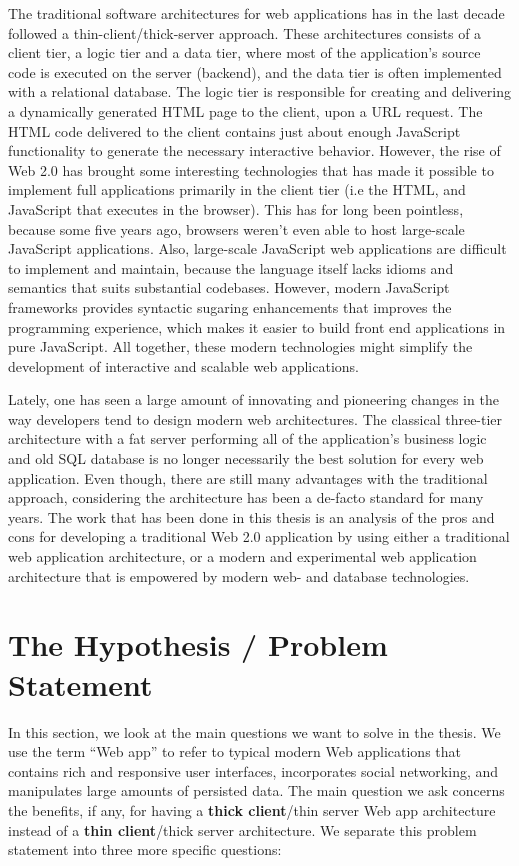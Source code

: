 The traditional software architectures for web applications has in the last decade followed a thin-client/thick-server approach. These architectures consists of a client tier, a logic tier and a data tier, where most of the application's source code is executed on the server (backend), and the data tier is often implemented with a relational database. The logic tier is responsible for creating and delivering a dynamically generated HTML page to the client, upon a URL request. The HTML code delivered to the client contains just about enough JavaScript functionality to generate the necessary interactive behavior. However, the rise of Web 2.0 has brought some interesting technologies that has made it possible to implement full applications primarily in the client tier (i.e the HTML, and JavaScript that executes in the browser). This has for long been pointless, because some five years ago, browsers weren't even able to host large-scale JavaScript applications. Also, large-scale JavaScript web applications are difficult to implement and maintain, because the language itself lacks idioms and semantics that suits substantial codebases. However, modern JavaScript frameworks provides syntactic sugaring enhancements that improves the programming experience, which makes it easier to build front end applications in pure JavaScript. All together, these modern technologies might simplify the development of interactive and scalable web applications. 

Lately, one has seen a large amount of innovating and pioneering changes in the way developers tend to design modern web architectures. The classical three-tier architecture with a fat server performing all of the application's business logic and old SQL database is no longer necessarily the best solution for every web application. Even though, there are still many advantages with the traditional approach, considering the architecture has been a de-facto standard for many years. The work that has been done in this thesis is an analysis of the pros and cons for developing a traditional Web 2.0 application by using either a traditional web application architecture, or a modern and experimental web application architecture that is empowered by modern web- and database technologies.


\section{The Hypothesis / Problem Statement}
In this section, we look at the main questions we want to solve in the thesis. We use the term ``Web app'' to refer to typical modern Web applications that contains rich and responsive user interfaces, incorporates social networking, and manipulates large amounts of persisted data. The main question we ask concerns the benefits, if any, for having a \textbf{thick client}/thin server Web app architecture instead of a \textbf{thin client}/thick server architecture. We separate this problem statement into three more specific questions: 

